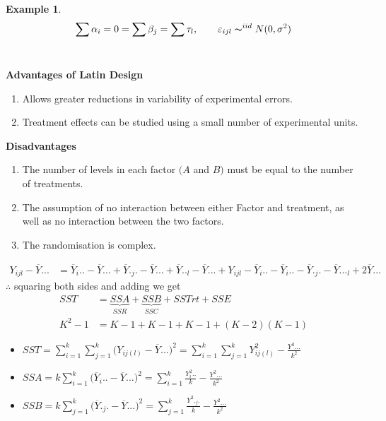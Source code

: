 \documentclass[11pt,a4paper]{article}
\theoremstyle{definition}
\newtheorem{exa}[thm]{Example}
\newcommand{\subhead}[1]{%
  \par\medskip\noindent\textbf{#1}\par\nobreak\smallskip}
\begin{document}
\begin{exa}
$$\sum \alpha_i = 0=\sum \beta_j=\sum \tau_l,\qquad  \varepsilon_{ijl}\thicksim^{iid}N(0,\sigma^2)$$\\


\subhead{Advantages of Latin Design}
\begin{enumerate}
\item Allows greater reductions in variability of experimental errors.
\item Treatment effects can be studied using a small number of experimental units.\\
\end{enumerate}


\subhead{Disadvantages}
\begin{enumerate}
\item The number of levels in each factor $(A$ and $B)$ must be equal to the number of treatments.
\item The assumption of no  interaction between either Factor and treatment, as well as no interaction between the two factors.
\item The randomisation is complex.\\
\end{enumerate}


\begin{align*}
Y_{ijl} - \overline{Y}... & = \overline{Y}_i..-\overline{Y}... + \overline{Y}._j.-\overline{Y}... + \overline{Y}.._l-\overline{Y}... + Y_{ijl}-\overline{Y}_i..-\overline{Y}_i..-\overline{Y}._j.-\overline{Y}..._l+2\overline{Y}...
\end{align*}
$\therefore$ squaring both sides and adding we get 
\begin{align*}
SST & = \underbrace{SSA}_{SSR} + \underbrace{SSB}_{SSC} + SSTrt +SSE\\
K^2-1 & = K-1 + K-1 + K- 1 + (K-2)(K-1)
\end{align*}


\begin{itemize}
\item[] $SST =\displaystyle{\sum^k_{i=1}\sum^k_{j=1}\big(Y_{ij(l)}-\overline{Y}...\big)^2=\sum^k_{i=1}\sum^k_{j=1}Y^2_{ij(l)}-\frac{Y^2...}{k^2}}$\\

\item[] $SSA = \displaystyle{k\sum^k_{i=1}\big(\overline{Y}_i..-\overline{Y}...\big)^2=\sum^k_{i=1}\frac{Y^2_i..}{k}-\frac{Y^2...}{k^2}}$\\

\item[] $SSB = \displaystyle{k\sum^k_{j=1}\big(\overline{Y}._j.-\overline{Y}...\big)^2=\sum^k_{j=1}\frac{Y^2._j.}{k}-\frac{Y^2...}{k^2}}$\\


\end{itemize}
\end{exa}
\end{document}
